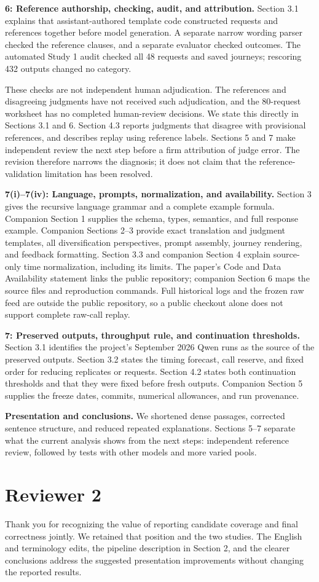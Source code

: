 \documentclass[11pt,a4paper]{scrartcl}
\begin{document}
\textbf{6: Reference authorship, checking, audit, and attribution.}
Section 3.1 explains that assistant-authored template code constructed requests and references together before model generation. A separate narrow wording parser checked the reference clauses, and a separate evaluator checked outcomes. The automated Study 1 audit checked all 48 requests and saved journeys; rescoring 432 outputs changed no category.

These checks are not independent human adjudication. The references and disagreeing judgments have not received such adjudication, and the 80-request worksheet has no completed human-review decisions. We state this directly in Sections 3.1 and 6. Section 4.3 reports judgments that disagree with provisional references, and describes replay using reference labels. Sections 5 and 7 make independent review the next step before a firm attribution of judge error. The revision therefore narrows the diagnosis; it does not claim that the reference-validation limitation has been resolved.

\textbf{7(i)--7(iv): Language, prompts, normalization, and availability.}
Section 3 gives the recursive language grammar and a complete example formula. Companion Section 1 supplies the schema, types, semantics, and full response example. Companion Sections 2--3 provide exact translation and judgment templates, all diversification perspectives, prompt assembly, journey rendering, and feedback formatting. Section 3.3 and companion Section 4 explain source-only time normalization, including its limits. The paper's Code and Data Availability statement links the public repository; companion Section 6 maps the source files and reproduction commands. Full historical logs and the frozen raw feed are outside the public repository, so a public checkout alone does not support complete raw-call replay.

\textbf{7: Preserved outputs, throughput rule, and continuation thresholds.}
Section 3.1 identifies the project's September 2026 Qwen runs as the source of the preserved outputs. Section 3.2 states the timing forecast, call reserve, and fixed order for reducing replicates or requests. Section 4.2 states both continuation thresholds and that they were fixed before fresh outputs. Companion Section 5 supplies the freeze dates, commits, numerical allowances, and run provenance.

\textbf{Presentation and conclusions.}
We shortened dense passages, corrected sentence structure, and reduced repeated explanations. Sections 5--7 separate what the current analysis shows from the next steps: independent reference review, followed by tests with other models and more varied pools.

\section*{Reviewer 2}

Thank you for recognizing the value of reporting candidate coverage and final correctness jointly. We retained that position and the two studies. The English and terminology edits, the pipeline description in Section 2, and the clearer conclusions address the suggested presentation improvements without changing the reported results.
\end{document}
